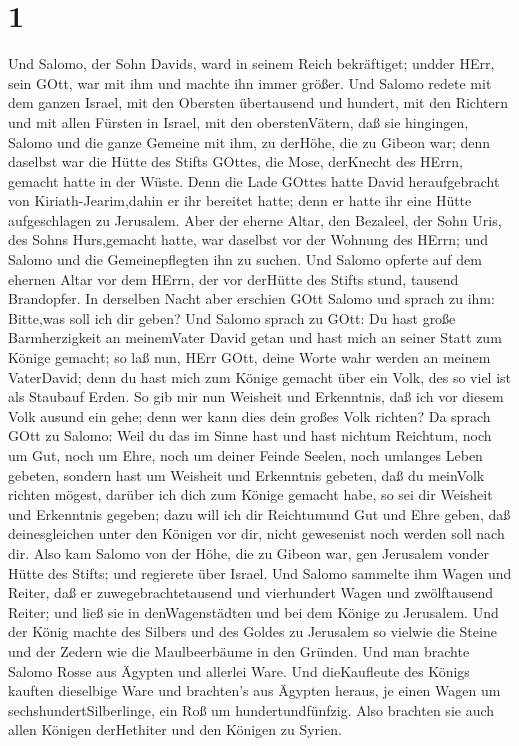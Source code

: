 \hypertarget{section}{%
\section{1}\label{section}}

 Und Salomo, der Sohn Davids, ward in seinem Reich
bekräftiget; undder HErr, sein GOtt, war mit ihm und machte ihn immer
größer.  Und Salomo redete mit dem ganzen Israel, mit den
Obersten übertausend und hundert, mit den Richtern und mit allen Fürsten
in Israel, mit den oberstenVätern,  daß sie hingingen,
Salomo und die ganze Gemeine mit ihm, zu derHöhe, die zu Gibeon war;
denn daselbst war die Hütte des Stifts GOttes, die Mose, derKnecht des
HErrn, gemacht hatte in der Wüste.  Denn die Lade GOttes
hatte David heraufgebracht von Kiriath-Jearim,dahin er ihr bereitet
hatte; denn er hatte ihr eine Hütte aufgeschlagen zu Jerusalem.
 Aber der eherne Altar, den Bezaleel, der Sohn Uris, des
Sohns Hurs,gemacht hatte, war daselbst vor der Wohnung des HErrn; und
Salomo und die Gemeinepflegten ihn zu suchen.  Und Salomo
opferte auf dem ehernen Altar vor dem HErrn, der vor derHütte des Stifts
stund, tausend Brandopfer.  In derselben Nacht aber erschien
GOtt Salomo und sprach zu ihm: Bitte,was soll ich dir geben?
 Und Salomo sprach zu GOtt: Du hast große Barmherzigkeit an
meinemVater David getan und hast mich an seiner Statt zum Könige
gemacht;  so laß nun, HErr GOtt, deine Worte wahr werden an
meinem VaterDavid; denn du hast mich zum Könige gemacht über ein Volk,
des so viel ist als Staubauf Erden.  So gib mir nun
Weisheit und Erkenntnis, daß ich vor diesem Volk ausund ein gehe; denn
wer kann dies dein großes Volk richten?  Da sprach GOtt zu
Salomo: Weil du das im Sinne hast und hast nichtum Reichtum, noch um
Gut, noch um Ehre, noch um deiner Feinde Seelen, noch umlanges Leben
gebeten, sondern hast um Weisheit und Erkenntnis gebeten, daß du
meinVolk richten mögest, darüber ich dich zum Könige gemacht habe,
 so sei dir Weisheit und Erkenntnis gegeben; dazu will ich
dir Reichtumund Gut und Ehre geben, daß deinesgleichen unter den Königen
vor dir, nicht gewesenist noch werden soll nach dir.  Also
kam Salomo von der Höhe, die zu Gibeon war, gen Jerusalem vonder Hütte
des Stifts; und regierete über Israel.  Und Salomo sammelte
ihm Wagen und Reiter, daß er zuwegebrachtetausend und vierhundert Wagen
und zwölftausend Reiter; und ließ sie in denWagenstädten und bei dem
Könige zu Jerusalem.  Und der König machte des Silbers und
des Goldes zu Jerusalem so vielwie die Steine und der Zedern wie die
Maulbeerbäume in den Gründen.  Und man brachte Salomo Rosse
aus Ägypten und allerlei Ware. Und dieKaufleute des Königs kauften
dieselbige Ware  und brachten's aus Ägypten heraus, je
einen Wagen um sechshundertSilberlinge, ein Roß um hundertundfünfzig.
Also brachten sie auch allen Königen derHethiter und den Königen zu
Syrien.

